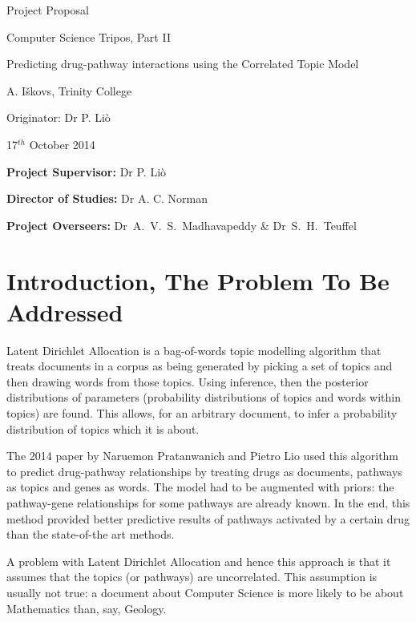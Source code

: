 \documentclass[12pt,a4]{article}
\begin{document}
\vfil

\centerline{\Large Project Proposal}
\vspace{0.4in}
\centerline{\Large Computer Science Tripos, Part II}
\vspace{0.4in}
\centerline{\Large Predicting drug-pathway interactions using the Correlated Topic Model }
\vspace{0.4in}
\centerline{\large A. I\v{s}kovs, Trinity College}
\vspace{0.3in}
\centerline{\large Originator: Dr P. Li\`{o}}
\vspace{0.3in}
\centerline{\large 17$^{th}$ October 2014}

\vfil


\noindent
{\bf Project Supervisor:} Dr P. Li\`{o}
\vspace{0.2in}

\noindent
{\bf Director of Studies:} Dr A. C. Norman
\vspace{0.2in}
\noindent
 
\noindent
{\bf Project Overseers:} Dr~A.~V.~S.~Madhavapeddy  \& Dr~S.~H.~Teuffel

\pagebreak


\section*{Introduction, The Problem To Be Addressed}

Latent Dirichlet Allocation\cite{Blei} is a bag-of-words topic modelling algorithm that treats documents in a corpus as being generated by picking a set of topics and then drawing words from those topics. Using inference, then the posterior distributions of parameters (probability distributions of topics and words within topics) are found. This allows, for an arbitrary document, to infer a probability distribution of topics which it is about.

The 2014 paper\cite{Pratanwanich2014} by Naruemon Pratanwanich and Pietro Lio used this algorithm to predict drug-pathway relationships by treating drugs as documents, pathways as topics and genes as words. The model had to be augmented with priors: the pathway-gene relationships for some pathways are already known. In the end, this method provided better predictive results of pathways activated by a certain drug than the state-of-the art methods.

A problem with Latent Dirichlet Allocation and hence this approach is that it assumes that the topics (or pathways) are uncorrelated. This assumption is usually not true: a document about Computer Science is more likely to be about Mathematics than, say, Geology. 
\end{document}
